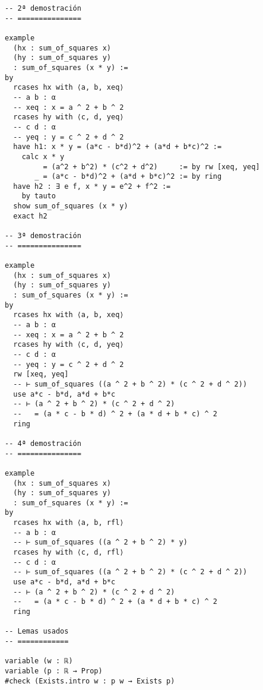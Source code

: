 \begin{verbatim}
-- 2ª demostración
-- ===============

example
  (hx : sum_of_squares x)
  (hy : sum_of_squares y)
  : sum_of_squares (x * y) :=
by
  rcases hx with ⟨a, b, xeq⟩
  -- a b : α
  -- xeq : x = a ^ 2 + b ^ 2
  rcases hy with ⟨c, d, yeq⟩
  -- c d : α
  -- yeq : y = c ^ 2 + d ^ 2
  have h1: x * y = (a*c - b*d)^2 + (a*d + b*c)^2 :=
    calc x * y
         = (a^2 + b^2) * (c^2 + d^2)     := by rw [xeq, yeq]
       _ = (a*c - b*d)^2 + (a*d + b*c)^2 := by ring
  have h2 : ∃ e f, x * y = e^2 + f^2 :=
    by tauto
  show sum_of_squares (x * y)
  exact h2

-- 3ª demostración
-- ===============

example
  (hx : sum_of_squares x)
  (hy : sum_of_squares y)
  : sum_of_squares (x * y) :=
by
  rcases hx with ⟨a, b, xeq⟩
  -- a b : α
  -- xeq : x = a ^ 2 + b ^ 2
  rcases hy with ⟨c, d, yeq⟩
  -- c d : α
  -- yeq : y = c ^ 2 + d ^ 2
  rw [xeq, yeq]
  -- ⊢ sum_of_squares ((a ^ 2 + b ^ 2) * (c ^ 2 + d ^ 2))
  use a*c - b*d, a*d + b*c
  -- ⊢ (a ^ 2 + b ^ 2) * (c ^ 2 + d ^ 2)
  --   = (a * c - b * d) ^ 2 + (a * d + b * c) ^ 2
  ring

-- 4ª demostración
-- ===============

example
  (hx : sum_of_squares x)
  (hy : sum_of_squares y)
  : sum_of_squares (x * y) :=
by
  rcases hx with ⟨a, b, rfl⟩
  -- a b : α
  -- ⊢ sum_of_squares ((a ^ 2 + b ^ 2) * y)
  rcases hy with ⟨c, d, rfl⟩
  -- c d : α
  -- ⊢ sum_of_squares ((a ^ 2 + b ^ 2) * (c ^ 2 + d ^ 2))
  use a*c - b*d, a*d + b*c
  -- ⊢ (a ^ 2 + b ^ 2) * (c ^ 2 + d ^ 2)
  --   = (a * c - b * d) ^ 2 + (a * d + b * c) ^ 2
  ring

-- Lemas usados
-- ============

variable (w : ℝ)
variable (p : ℝ → Prop)
#check (Exists.intro w : p w → Exists p)
\end{verbatim}

